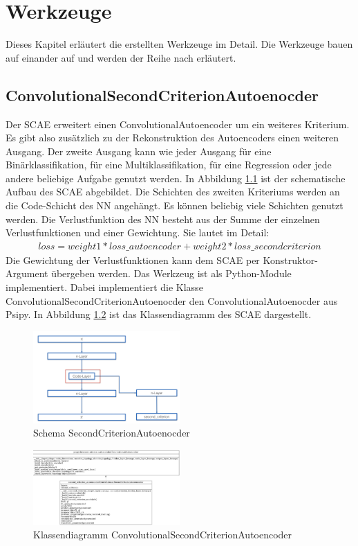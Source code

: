 
\chapter{Werkzeuge}
\label{chap:Werkzeuge}
Dieses Kapitel erläutert die erstellten Werkzeuge im Detail. Die Werkzeuge bauen auf einander auf und werden der Reihe nach erläutert. 

	\section{ConvolutionalSecondCriterionAutoenocder}
	\label{sec:SecondCriterionAutoenocder}
	Der SCAE erweitert einen ConvolutionalAutoencoder um ein weiteres Kriterium. Es gibt also zusätzlich zu der Rekonstruktion des Autoencoders einen weiteren Ausgang. Der zweite Ausgang kann wie jeder Ausgang für eine Binärklassifikation, für eine Multiklassifikation, für eine Regression oder jede andere beliebige Aufgabe genutzt werden. In Abbildung \ref{img:SchemaSCAE} ist der schematische Aufbau des SCAE abgebildet. Die Schichten des zweiten Kriteriums werden an die Code-Schicht des NN angehängt. Es können beliebig  viele Schichten genutzt werden. Die Verlustfunktion des NN besteht aus der Summe der einzelnen Verlustfunktionen und einer Gewichtung. Sie lautet im Detail: 
	\begin{align}
	loss = weight1 * loss\_autoencoder + weight2 * loss\_secondcriterion
	\end{align}
	Die Gewichtung der Verlustfunktionen kann dem SCAE per Konstruktor-Argument übergeben werden. Das Werkzeug ist als Python-Module implementiert. Dabei implementiert die Klasse ConvolutionalSecondCriterionAutoenocder den ConvolutionalAutoenocder aus Psipy. In Abbildung \ref{img:KlassendiagrammCSCAE} ist das Klassendiagramm des SCAE dargestellt.
	\begin{figure}[h]
		\centering
		\includegraphics[width=0.5\textwidth, center]{bilder/Schema_Autoencoders/Schema_SCAE.png}
		\caption[Schema SecondCriterionAutoenocder]{Schema SecondCriterionAutoenocder}
		\label{img:SchemaSCAE}
	\end{figure}  
	\begin{figure}[h]
		\centering
		\includegraphics[width=0.5\textwidth, center]{bilder/Klassendiagramme/Klassendiagramm_CSCAE.png}
		\caption[Klassendiagramm ConvolutionalSecondCriterionAutoencoder]{Klassendiagramm ConvolutionalSecondCriterionAutoencoder}
	    \label{img:KlassendiagrammCSCAE}
	\end{figure}  
